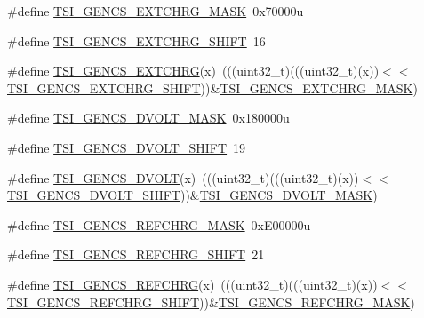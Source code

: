 \begin{DoxyCompactItemize}
\item 
\#define \hyperlink{group___t_s_i___register___masks_ga14b70379252ea633e8c97c1ab13553c6}{T\+S\+I\+\_\+\+G\+E\+N\+C\+S\+\_\+\+E\+X\+T\+C\+H\+R\+G\+\_\+\+M\+A\+SK}~0x70000u
\item 
\#define \hyperlink{group___t_s_i___register___masks_gaf6315fa37479b4e49a6f3252a451352b}{T\+S\+I\+\_\+\+G\+E\+N\+C\+S\+\_\+\+E\+X\+T\+C\+H\+R\+G\+\_\+\+S\+H\+I\+FT}~16
\item 
\#define \hyperlink{group___t_s_i___register___masks_gab5fefdd5c15d6e5d832d2843a15a167a}{T\+S\+I\+\_\+\+G\+E\+N\+C\+S\+\_\+\+E\+X\+T\+C\+H\+RG}(x)~(((uint32\+\_\+t)(((uint32\+\_\+t)(x))$<$$<$\hyperlink{group___t_s_i___register___masks_gaf6315fa37479b4e49a6f3252a451352b}{T\+S\+I\+\_\+\+G\+E\+N\+C\+S\+\_\+\+E\+X\+T\+C\+H\+R\+G\+\_\+\+S\+H\+I\+FT}))\&\hyperlink{group___t_s_i___register___masks_ga14b70379252ea633e8c97c1ab13553c6}{T\+S\+I\+\_\+\+G\+E\+N\+C\+S\+\_\+\+E\+X\+T\+C\+H\+R\+G\+\_\+\+M\+A\+SK})
\item 
\#define \hyperlink{group___t_s_i___register___masks_ga5f993b291aa5098c00c7ca603d76fa8c}{T\+S\+I\+\_\+\+G\+E\+N\+C\+S\+\_\+\+D\+V\+O\+L\+T\+\_\+\+M\+A\+SK}~0x180000u
\item 
\#define \hyperlink{group___t_s_i___register___masks_gabef14bd85b2c22b59a963796a510d2aa}{T\+S\+I\+\_\+\+G\+E\+N\+C\+S\+\_\+\+D\+V\+O\+L\+T\+\_\+\+S\+H\+I\+FT}~19
\item 
\#define \hyperlink{group___t_s_i___register___masks_ga00fe2f1ed68ec2cc7c65063d9c0c4bde}{T\+S\+I\+\_\+\+G\+E\+N\+C\+S\+\_\+\+D\+V\+O\+LT}(x)~(((uint32\+\_\+t)(((uint32\+\_\+t)(x))$<$$<$\hyperlink{group___t_s_i___register___masks_gabef14bd85b2c22b59a963796a510d2aa}{T\+S\+I\+\_\+\+G\+E\+N\+C\+S\+\_\+\+D\+V\+O\+L\+T\+\_\+\+S\+H\+I\+FT}))\&\hyperlink{group___t_s_i___register___masks_ga5f993b291aa5098c00c7ca603d76fa8c}{T\+S\+I\+\_\+\+G\+E\+N\+C\+S\+\_\+\+D\+V\+O\+L\+T\+\_\+\+M\+A\+SK})
\item 
\#define \hyperlink{group___t_s_i___register___masks_ga497b1a716e54da9ae1f89fe866c9dfec}{T\+S\+I\+\_\+\+G\+E\+N\+C\+S\+\_\+\+R\+E\+F\+C\+H\+R\+G\+\_\+\+M\+A\+SK}~0x\+E00000u
\item 
\#define \hyperlink{group___t_s_i___register___masks_ga53636ad4be1c8098f9475103fdc056e2}{T\+S\+I\+\_\+\+G\+E\+N\+C\+S\+\_\+\+R\+E\+F\+C\+H\+R\+G\+\_\+\+S\+H\+I\+FT}~21
\item 
\#define \hyperlink{group___t_s_i___register___masks_ga715bd94ad29e87470a8addab0a2f04e4}{T\+S\+I\+\_\+\+G\+E\+N\+C\+S\+\_\+\+R\+E\+F\+C\+H\+RG}(x)~(((uint32\+\_\+t)(((uint32\+\_\+t)(x))$<$$<$\hyperlink{group___t_s_i___register___masks_ga53636ad4be1c8098f9475103fdc056e2}{T\+S\+I\+\_\+\+G\+E\+N\+C\+S\+\_\+\+R\+E\+F\+C\+H\+R\+G\+\_\+\+S\+H\+I\+FT}))\&\hyperlink{group___t_s_i___register___masks_ga497b1a716e54da9ae1f89fe866c9dfec}{T\+S\+I\+\_\+\+G\+E\+N\+C\+S\+\_\+\+R\+E\+F\+C\+H\+R\+G\+\_\+\+M\+A\+SK})
$$
\end{DoxyCompactItemize}
